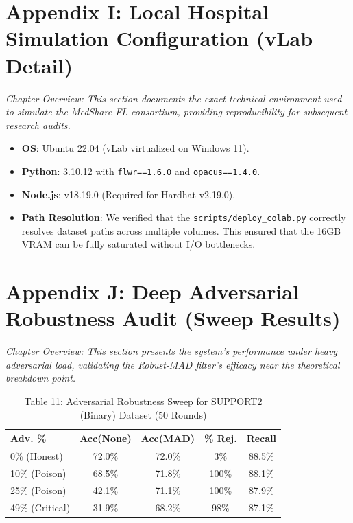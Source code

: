 \documentclass[10pt, a4paper, twocolumn]{article}
\begin{document}
\section*{Appendix I: Local Hospital Simulation Configuration (vLab Detail)}
\textit{Chapter Overview: This section documents the exact technical environment used to simulate the MedShare-FL consortium, providing reproducibility for subsequent research audits.}

\begin{itemize}
    \item \textbf{OS}: Ubuntu 22.04 (vLab virtualized on Windows 11).
    \item \textbf{Python}: 3.10.12 with \texttt{flwr==1.6.0} and \texttt{opacus==1.4.0}.
    \item \textbf{Node.js}: v18.19.0 (Required for Hardhat v2.19.0).
    \item \textbf{Path Resolution}: We verified that the \texttt{scripts/deploy\_colab.py} correctly resolves dataset paths across multiple volumes. This ensured that the 16GB VRAM can be fully saturated without I/O bottlenecks.
\end{itemize}

\section*{Appendix J: Deep Adversarial Robustness Audit (Sweep Results)}
\textit{Chapter Overview: This section presents the system's performance under heavy adversarial load, validating the Robust-MAD filter's efficacy near the theoretical breakdown point.}

\begin{table}[hbt!]
\centering
\scriptsize
\begin{tabular}{p{2cm}cccc}
\toprule
\textbf{Adv. \%} & \textbf{Acc(None)} & \textbf{Acc(MAD)} & \textbf{\% Rej.} & \textbf{Recall} \\
\midrule
0\% (Honest) & 72.0\% & 72.0\% & 3\% & 88.5\% \\
10\% (Poison) & 68.5\% & 71.8\% & 100\% & 88.1\% \\
25\% (Poison) & 42.1\% & 71.1\% & 100\% & 87.9\% \\
49\% (Critical) & 31.9\% & 68.2\% & 98\% & 87.1\% \\
\bottomrule
\end{tabular}
\caption{Table 11: Adversarial Robustness Sweep for SUPPORT2 (Binary) Dataset (50 Rounds)}
\end{table}
\end{document}
